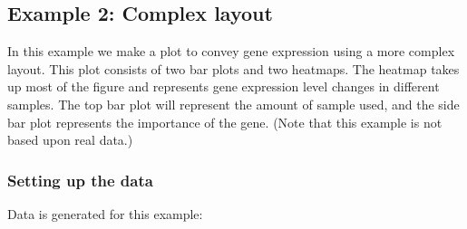 \documentclass[letterpaper]{article}\usepackage[]{graphicx}\usepackage[]{color}
\begin{document}
\subsection{Example 2: Complex layout}

In this example we make a plot to convey gene expression using a more complex layout. This plot consists of two bar plots and two heatmaps. The heatmap takes up most of the figure and represents gene expression level changes in different samples. The top bar plot will represent the amount of sample used, and the side bar plot represents the importance of the gene. (Note that this example is not based upon real data.)

\subsubsection{Setting up the data}

Data is generated for this example: 
\end{document}
